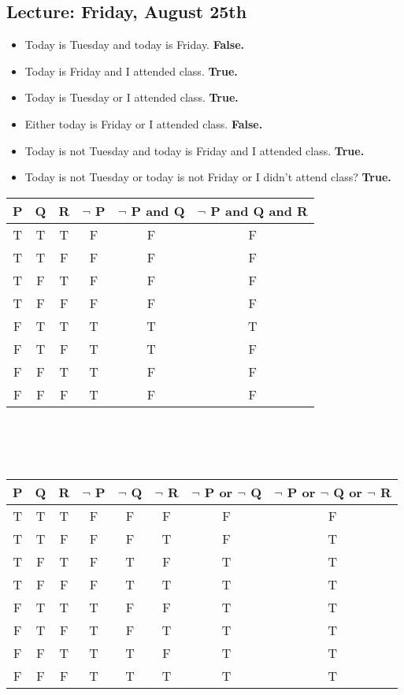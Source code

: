 \documentclass[10pt]{article}
\theoremstyle{plain}
\theoremstyle{definition}
\begin{document}
\maketitle

\subsection*{Lecture: Friday, August 25th}

\begin{itemize}
\item Today is Tuesday and today is Friday. \textbf{False.} 
\item Today is Friday and I attended class. \textbf{True. }
\item Today is Tuesday or I attended class. \textbf{True. }
\item Either today is Friday or I attended class.  \textbf{False.} 
\item Today is not Tuesday and today is Friday and I attended class. \textbf{True. }
\item Today is not Tuesday or today is not Friday or I didn't attend class? \textbf{True.} 
\end{itemize}

\begin{tabular}{c|c|c|c|c|c}
P & Q & R & $\neg$ P & $\neg$ P and Q & $\neg$ P and Q and R \\
\hline
T & T & T & F & F & F\\
T & T & F & F & F & F\\
T & F & T & F & F & F\\
T & F & F & F & F & F\\
\hline
F & T & T & T & T & T\\
F & T & F & T & T & F\\
F & F & T & T & F & F\\
F & F & F & T & F & F\\


\end{tabular}\\\\\\

\begin{tabular}{c|c|c|c|c|c|c|c}
P & Q & R & $\neg$ P & $\neg$ Q & $\neg$ R & $\neg$ P or $\neg$ Q & $\neg$ P or $\neg$ Q or $\neg$ R\\
\hline
T & T & T & F & F & F & F & F\\
T & T & F & F & F & T & F & T\\
T & F & T & F & T & F & T & T\\
T & F & F & F & T & T & T & T\\
\hline
F & T & T & T & F & F & T & T\\
F & T & F & T & F & T & T & T\\
F & F & T & T & T & F & T & T\\
F & F & F & T & T & T & T & T\\


\end{tabular}\\\\\
\end{document}
